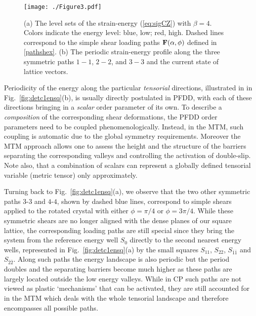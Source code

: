 \documentclass[CRPHYS,Unicode,manuscript]{cedram}
\begin{document}
%
\begin{figure}[tbp!]
\centering
\texttt{[image: ./Figure3.pdf]}
\caption{\scriptsize {(a) The level sets of the  strain-energy  (\ref{eq:sigCZ})  with $\beta=4$. Colors indicate the energy level: blue, low; red, high. Dashed lines correspond to the  simple shear loading paths $\bold F(\alpha,\phi)$ defined  in  \eqref{pathshex}.
(b) The periodic strain-energy profile along the three symmetric paths $1-1$, $2-2$, and $3-3$ and the current state of lattice vectors.
}}
 \label{fig:detc1enhex}
\end{figure}
%

Periodicity of the energy along the particular  \emph{tensorial} directions, illustrated in  in   Fig.~\ref{fig:detc1ensq}(b),  is usually directly postulated in PFDD,   with each  of these directions bringing in a \emph{scalar} order parameter of its own. To describe  a \emph{composition} of  the corresponding shear deformations, the  PFDD  order parameters need to be coupled phenomenologically. Instead, in the MTM,  such coupling is automatic due to the global symmetry requirements.  Moreover the MTM approach  allows one to assess the height and the structure of the barriers  separating the corresponding valleys and controlling the activation of  double-slip.  Note also, that a combination of scalars can represent a globally defined tensorial variable (metric tensor) only approximately.
   
Turning back to   Fig.~\ref{fig:detc1ensq}(a), we observe that the   two other symmetric paths  $3$-$3$ and  $4$-$4$, shown   by  dashed blue lines,    correspond to simple shears applied to  the rotated crystal   with either $\phi=\pi/4$
or  $\phi=3\pi/4$.  While  these symmetric shears are no longer    aligned with the dense planes  of our  square lattice, the corresponding   loading paths are still  special since they bring the system from the reference  energy well $S_0$ directly to the second nearest   energy wells, represented in  Fig.~\ref{fig:detc1ensq}(a)  by  the small squares  $S_{11}$, $S_{22}$, $S_{\bar 1 \bar1}$ and  $S_{\bar 2 \bar 2}$.  Along such paths the energy landscape is also periodic but the period doubles and the separating barriers become much higher as these paths are largely located outside the low energy valleys.  While in CP such paths are not viewed as plastic `mechanisms' that can be activated, they are  still accounted for in the MTM  which deals with the whole tensorial landscape and therefore encompasses all possible paths.
\end{document}
